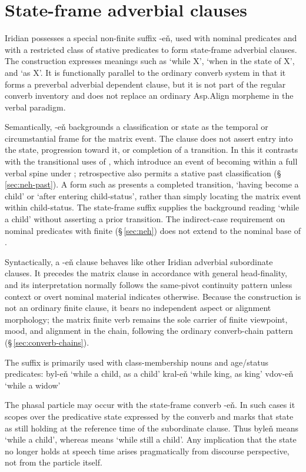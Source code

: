 \section{State-frame adverbial clauses}
\label{sec:state-frame}

Iridian possesses a special non-finite suffix -eň, used with nominal predicates
and with a restricted class of stative predicates to form state-frame adverbial
clauses. The construction expresses meanings such as ‘while X’, ‘when in the
state of X’, and ‘as X’. It is functionally parallel to the ordinary converb
system in that it forms a preverbal adverbial dependent clause, but it is not
part of the regular converb inventory and does not replace an ordinary Asp.Align
morpheme in the verbal paradigm.

Semantically, -eň backgrounds a classification or state as the temporal or
circumstantial frame for the matrix event. The clause does not assert entry into
the state, progression toward it, or completion of a transition. In this it
contrasts with the transitional uses of , which introduce an
event of becoming within a full verbal spine under ;
retrospective  also permits a stative past classification
(§\,\ref{sec:neh-past}). A form such as  presents a completed
transition, ‘having become a child’ or ‘after entering child-status’, rather than simply locating the
matrix event within child-status. The state-frame suffix  supplies
the background reading ‘while a child’ without asserting a prior transition.
The indirect-case requirement on nominal predicates with finite 
(§\,\ref{sec:neh}) does not extend to the nominal base of .

Syntactically, a -eň clause behaves like other Iridian adverbial subordinate
clauses. It precedes the matrix clause in accordance with general head-finality,
and its interpretation normally follows the same-pivot continuity pattern unless
context or overt nominal material indicates otherwise. Because the construction
is not an ordinary finite clause, it bears no independent aspect or alignment
morphology; the matrix finite verb remains the sole carrier of finite viewpoint, mood, and
alignment in the chain, following the ordinary converb-chain pattern
(§\,\ref{sec:converb-chains}).


The suffix is primarily used with class-membership nouns and age/status
predicates: byl-eň ‘while a child, as a child’ kral-eň ‘while king, as king’
vdov-eň ‘while a widow’

The phasal particle  may occur with the state-frame converb -eň. In such cases
it scopes over the predicative state expressed by the converb and marks that
state as still holding at the reference time of the subordinate clause. Thus
byleň means ‘while a child’, whereas  means ‘while still a child’. Any
implication that the state no longer holds at speech time arises pragmatically
from discourse perspective, not from the particle itself.
